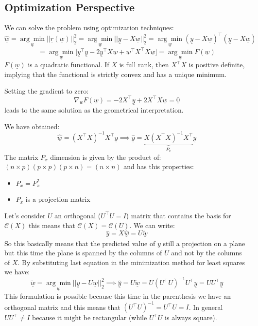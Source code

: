 \subsection*{Optimization Perspective}
We can solve the problem using optimization techniques:
\[
    \hat{\underline{w}} = \underset{\underline{w}}{\arg\min}||\underline{r}(\underline{w})||^2_2 = \underset{\underline{w}}{\arg\min}||\underline{y} - X\underline{w}||^2_2 = \underset{\underline{w}}{\arg\min}(\underline{y} - X\underline{w})^\intercal(\underline{y} - X\underline{w})
\]
\[
    = \underset{\underline{w}}{\arg\min} \bigg[\underline{y}^\intercal \underline{y} - 2\underline{y}^\intercal X\underline{w} + \underline{w}^\intercal X^\intercal X\underline{w}\bigg] = \underset{\underline{w}}{\arg\min} F(\underline{w})
\]
$F(\underline{w})$ is a quadratic functional. If $X$ is full rank, then $X^\intercal X$ is positive definite, implying that the functional is strictly convex and has a unique minimum.

Setting the gradient to zero:
\[
    \nabla_{\underline{w}}F(\underline{w}) = -2X^\intercal \underline{y} + 2X^\intercal X\underline{w} = \underline{0}
\]
leads to the same solution as the geometrical interpretation.


We have obtained:
\[
    \underline{\hat{w}} = (X^\intercal X)^{-1} X^\intercal \underline{y} \implies \underline{\hat{y}} = \underbrace{X(X^\intercal X)^{-1} X^\intercal}_{P_x} \underline{y}     
\]
The matrix $P_x$ dimension is given by the product of: $(n\times p)(p\times p)(p \times n) = (n\times n)$ and has this properties:
\begin{itemize}
    \item $P_x = P_x^2$
    \item $P_x$ is a projection matrix
\end{itemize}

Let's consider $U$ an orthogonal ($U^\intercal U = I$) matrix that contains the basis for $\mathcal{C}(X)$ this means that $\mathcal{C}(X) = \mathcal{C}(U)$. We can write:
\[
    \underline{\hat{y}} = X\underline{\hat{w}} = U\underline{\tilde{w}}    
\]
So this basically means that the predicted value of $y$ still a projection on a plane but this time the plane is spanned by the columns of $U$ and not by the columns of $X$. By substituting last equation in the minimization method for least squares we have:
\[
    \underline{\tilde{w}} = \underset{\underline{w}}{\arg\min} ||\underline{y} - U\underline{w}||^2_2 \implies \underline{\hat{y}} = U\underline{\tilde{w}} = U(U^\intercal U)^{-1}U^\intercal \underline{y} = UU^\intercal \underline{y} 
\]
This formulation is possible because this time in the parenthesis we have an orthogonal matrix and this means that $(U^\intercal U)^{-1} = U^\intercal U = I$. In general $UU^\intercal \neq I$ because it might be rectangular (while $U^\intercal U$ is always square).\\







